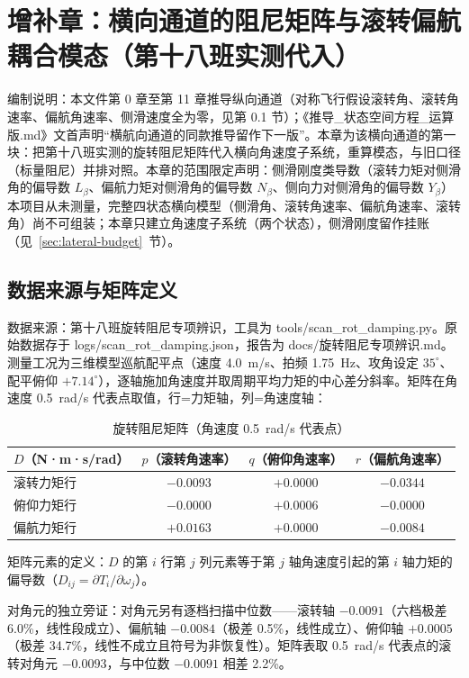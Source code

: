\documentclass[11pt,a4paper]{ctexart}
\begin{document}
\section{增补章：横向通道的阻尼矩阵与滚转偏航耦合模态（第十八班实测代入）}\label{sec:lateral}

编制说明：本文件第 0 章至第 11 章推导纵向通道（对称飞行假设滚转角、滚转角速率、偏航角速率、侧滑速度全为零，见第 0.1 节）；《推导\_状态空间方程\_运算版.md》文首声明“横航向通道的同款推导留作下一版”。本章为该横向通道的第一块：把第十八班实测的旋转阻尼矩阵代入横向角速度子系统，重算模态，与旧口径（标量阻尼）并排对照。本章的范围限定声明：侧滑刚度类导数（滚转力矩对侧滑角的偏导数 $L_\beta$、偏航力矩对侧滑角的偏导数 $N_\beta$、侧向力对侧滑角的偏导数 $Y_\beta$）本项目从未测量，完整四状态横向模型（侧滑角、滚转角速率、偏航角速率、滚转角）尚不可组装；本章只建立角速度子系统（两个状态），侧滑刚度留作挂账（见~\ref{sec:lateral-budget}~节）。

\subsection{数据来源与矩阵定义}

数据来源：第十八班旋转阻尼专项辨识，工具为 tools/scan\_rot\_damping.py。原始数据存于 logs/scan\_rot\_damping.json，报告为 docs/旋转阻尼专项辨识.md。测量工况为三维模型巡航配平点（速度 4.0~m/s、拍频 1.75~Hz、攻角设定 $35^\circ$、配平俯仰 $+7.14^\circ$），逐轴施加角速度并取周期平均力矩的中心差分斜率。矩阵在角速度 0.5~rad/s 代表点取值，行=力矩轴，列=角速度轴：

\begin{table}[htbp]
\centering\small
\begin{tabular}{lccc}
\toprule
$D$（N·m·s/rad） & $p$（滚转角速率） & $q$（俯仰角速率） & $r$（偏航角速率） \\
\midrule
滚转力矩行 & $-0.0093$ & $+0.0000$ & $-0.0344$ \\
俯仰力矩行 & $-0.0000$ & $+0.0006$ & $-0.0000$ \\
偏航力矩行 & $+0.0163$ & $+0.0000$ & $-0.0084$ \\
\bottomrule
\end{tabular}
\caption{旋转阻尼矩阵（角速度 0.5~rad/s 代表点）}
\end{table}

矩阵元素的定义：$D$ 的第 $i$ 行第 $j$ 列元素等于第 $j$ 轴角速度引起的第 $i$ 轴力矩的偏导数（$D_{ij}=\partial T_i/\partial\omega_j$）。

对角元的独立旁证：对角元另有逐档扫描中位数——滚转轴 $-0.0091$（六档极差 6.0\%，线性段成立）、偏航轴 $-0.0084$（极差 0.5\%，线性成立）、俯仰轴 $+0.0005$（极差 34.7\%，线性不成立且符号为非恢复性）。矩阵表取 0.5~rad/s 代表点的滚转对角元 $-0.0093$，与中位数 $-0.0091$ 相差 2.2\%。
\end{document}
